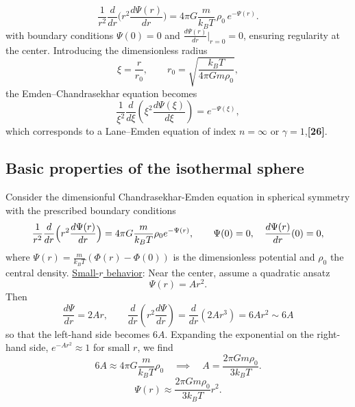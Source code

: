 \documentclass[12pt,a4paper]{article}
\numberwithin{equation}{section}
\begin{document}
\begin{equation}
\frac{1}{r^2} \frac{d}{dr} \Big( r^2 \frac{d \Psi(r)}{dr} \Big)
= 4 \pi G \frac{m}{k_B T} \, \rho_0 \, e^{-\Psi(r)}.
\end{equation}
with boundary conditions $\Psi(0) = 0 $ and $\frac{d\Psi(r)}{dr}\Big|_{r=0} = 0 $, ensuring regularity at the center. Introducing the dimensionless radius
\begin{equation}
\xi = \frac{r}{r_0}, \qquad r_0 = \sqrt{\frac{k_B T}{4 \pi G m \rho_0}},
\end{equation}
the Emden--Chandrasekhar equation becomes
\begin{equation}
\frac{1}{\xi^2} \frac{d}{d\xi} \left( \xi^2 \frac{d \Psi(\xi)}{d\xi} \right) = e^{-\Psi(\xi)},
\end{equation}
which corresponds to a Lane--Emden equation of index $n = \infty$ or $\gamma=1$,\textbf{[26]}.

\subsection{Basic properties of the isothermal sphere}
Consider the dimensionful Chandrasekhar-Emden equation in spherical symmetry with the prescribed boundary conditions
\begin{equation}
\frac{1}{r^2}\frac{d}{dr}\Bigl(r^2 \frac{d \Psi(r)}{dr} \Bigr) = 4 \pi G \frac{m}{k_B T} \rho_0 e^{-\Psi(r)},
\qquad \Psi(0)=0, \quad \frac{d\Psi(r)}{dr}(0)=0,
\end{equation}
where $\Psi(r) = \frac{m}{k_B T} (\Phi(r)-\Phi(0))$ is the dimensionless potential and $\rho_0$ the central density.
\noindent \underline{Small-$r$ behavior}: Near the center, assume a quadratic ansatz
\begin{equation}
\Psi(r) = A r^2.
\end{equation}
Then
\begin{equation*}
\frac{d\Psi}{dr} = 2 A r, \qquad
\frac{d}{dr}\left(r^2 \frac{d\Psi}{dr}\right) = \frac{d}{dr} (2 A r^3) = 6 A r^2 \sim 6A
\end{equation*}
so that the left-hand side becomes $6 A$. Expanding the exponential on the right-hand side, $e^{-A r^2} \approx 1$ for small $r$, we find
\begin{equation*}
6 A \approx 4 \pi G \frac{m}{k_B T} \rho_0 \quad \implies \quad
A = \frac{2 \pi G m \rho_0}{3 k_B T}.
\end{equation*}
\begin{equation}
\Psi(r) \approx \frac{2 \pi G m \rho_0}{3 k_B T} r^2.
\end{equation}
\end{document}
